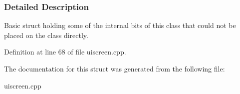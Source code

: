 \subsubsection{Detailed Description}
Basic struct holding some of the internal bits of this class that could not be placed on the class directly. 

Definition at line 68 of file uiscreen.cpp.



The documentation for this struct was generated from the following file:\begin{DoxyCompactItemize}
\item 
uiscreen.cpp\end{DoxyCompactItemize}
